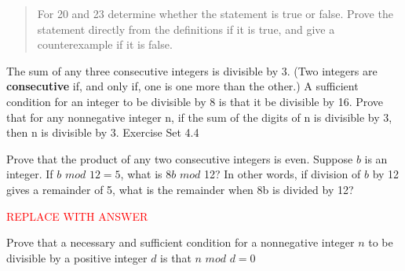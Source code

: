 \documentclass[12pt,letterpaper, onecolumn]{exam}
\begin{document}
	\begin{questions}
		\begin{quote}
			For 20 and 23 determine whether the statement is true or false. Prove the statement directly from the definitions if it is true, and give a counterexample if it is false.
		\end{quote}
		\setcounter{question}{19} \question The sum of any three consecutive integers is divisible by 3. (Two integers are \textbf{consecutive} if, and only if, one is one more than the other.)
		\setcounter{question}{22} \question A sufficient condition for an integer to be divisible by 8 is that it be divisible by 16.
		\setcounter{question}{47} \question Prove that for any nonnegative integer n, if the sum of the digits of n is divisible by 3, then n is divisible by 3.
		\centering\large Exercise Set 4.4
		\begin{questions}
			\setcounter{question}{7} \question 
			\setcounter{question}{16} \question Prove that the product of any two consecutive integers is even.
			\setcounter{question}{20} \question Suppose $b$ is an integer. If $b$ $mod$ $12=5$, what is $8b$ $mod$ 12? In other words, if division of $b$ by 12 gives a remainder of 5, what is the remainder when 8b is divided by 12?
			\begin{solution}
				\textcolor{red}{REPLACE WITH ANSWER}
			\end{solution} 
			\setcounter{question}{25} \question Prove that a necessary and sufficient condition for a nonnegative integer $n$ to be divisible by a positive integer $d$ is that $n$ $mod$ $d=0$
			

\end{questions}
\end{questions}
\end{document}
